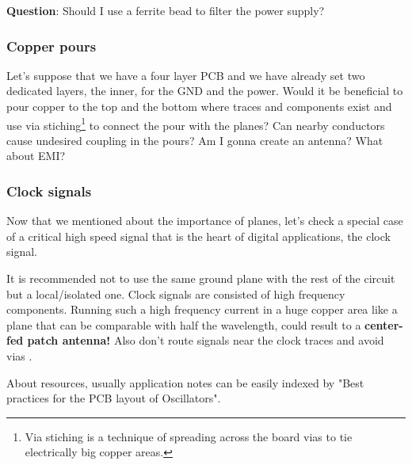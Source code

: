 \documentclass[final]{cubedoc}
\begin{document}
	\textbf{Question}: Should I use a ferrite bead to filter the power supply?
	
	\subsubsection{Copper pours}
	
	Let's suppose that we have a four layer PCB and we have already set two dedicated layers, the inner, for the GND and the power. Would it be beneficial to pour copper to the top and the bottom where traces and components exist and use via stiching\footnote{Via stiching is a technique of spreading across the board vias to tie electrically big copper areas.} to connect the pour with the planes? Can nearby conductors cause undesired coupling in the pours? Am I gonna create an antenna? What about EMI?
	
	\subsubsection{Clock signals}
	
	Now that we mentioned about the importance of planes, let's check a special case of a critical high speed signal that is the heart of digital applications, the clock signal.
	
	It is recommended not to use the same ground plane with the rest of the circuit but a local/isolated one. Clock signals are consisted of high frequency components. Running such a high frequency current in a huge copper area like a plane that can be comparable with half the wavelength, could result to a \textbf{center-fed patch antenna!} Also don't route signals near the clock traces and avoid vias \cite{stackexchange:decoupling, stackexchange:crystal, atmel:clock}.
	
	About resources, usually application notes can be easily indexed by "Best practices for the PCB layout of Oscillators".
	
	
	
	
\end{document}
